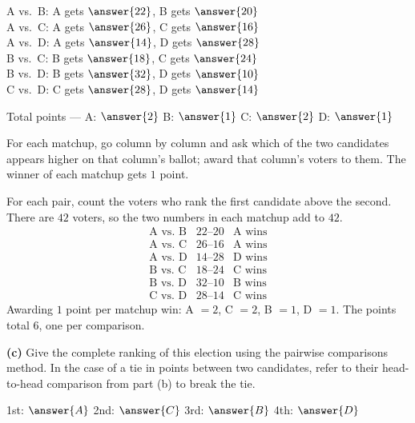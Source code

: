 \documentclass[12pt]{ximera}
\begin{document}
\begin{problem}
\begin{prompt}
A vs.\ B: A gets $\answer{22}$, B gets $\answer{20}$ \\
A vs.\ C: A gets $\answer{26}$, C gets $\answer{16}$ \\
A vs.\ D: A gets $\answer{14}$, D gets $\answer{28}$ \\
B vs.\ C: B gets $\answer{18}$, C gets $\answer{24}$ \\
B vs.\ D: B gets $\answer{32}$, D gets $\answer{10}$ \\
C vs.\ D: C gets $\answer{28}$, D gets $\answer{14}$

\smallskip
Total points --- A: $\answer{2}$ \quad B: $\answer{1}$ \quad C: $\answer{2}$ \quad D: $\answer{1}$

\begin{hint}
For each matchup, go column by column and ask which of the two candidates appears
higher on that column's ballot; award that column's voters to them. The winner of each
matchup gets $1$ point.
\end{hint}

\begin{feedback}
For each pair, count the voters who rank the first candidate above the second. There
are $42$ voters, so the two numbers in each matchup add to $42$.
\[
\begin{array}{lll}
\text{A vs.\ B} & 22\text{--}20 & \text{A wins}\\
\text{A vs.\ C} & 26\text{--}16 & \text{A wins}\\
\text{A vs.\ D} & 14\text{--}28 & \text{D wins}\\
\text{B vs.\ C} & 18\text{--}24 & \text{C wins}\\
\text{B vs.\ D} & 32\text{--}10 & \text{B wins}\\
\text{C vs.\ D} & 28\text{--}14 & \text{C wins}
\end{array}
\]
Awarding $1$ point per matchup win: A $= 2$, C $= 2$, B $= 1$, D $= 1$. The points
total $6$, one per comparison. \checkmark
\end{feedback}
\end{prompt}

\begin{prompt}
\textbf{(c)} Give the complete ranking of this election using the pairwise comparisons
method. In the case of a tie in points between two candidates, refer to their
head-to-head comparison from part (b) to break the tie.

1st: $\answer{A}$ \quad 2nd: $\answer{C}$ \quad 3rd: $\answer{B}$ \quad 4th: $\answer{D}$


\end{prompt}
\end{problem}
\end{document}
